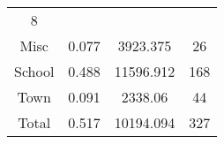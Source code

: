\documentclass[]{book}
\theoremstyle{definition}
\theoremstyle{definition}
\theoremstyle{definition}
\theoremstyle{remark}
\begin{document}
\begin{longtable}[]{@{}cccc@{}}
\begin{minipage}[t]{0.15\columnwidth}
8\strut
\end{minipage}\tabularnewline
\begin{minipage}[t]{0.12\columnwidth}\centering\strut
Misc\strut
\end{minipage} & \begin{minipage}[t]{0.11\columnwidth}\centering\strut
0.077\strut
\end{minipage} & \begin{minipage}[t]{0.15\columnwidth}\centering\strut
3923.375\strut
\end{minipage} & \begin{minipage}[t]{0.15\columnwidth}\centering\strut
26\strut
\end{minipage}\tabularnewline
\begin{minipage}[t]{0.12\columnwidth}\centering\strut
School\strut
\end{minipage} & \begin{minipage}[t]{0.11\columnwidth}\centering\strut
0.488\strut
\end{minipage} & \begin{minipage}[t]{0.15\columnwidth}\centering\strut
11596.912\strut
\end{minipage} & \begin{minipage}[t]{0.15\columnwidth}\centering\strut
168\strut
\end{minipage}\tabularnewline
\begin{minipage}[t]{0.12\columnwidth}\centering\strut
Town\strut
\end{minipage} & \begin{minipage}[t]{0.11\columnwidth}\centering\strut
0.091\strut
\end{minipage} & \begin{minipage}[t]{0.15\columnwidth}\centering\strut
2338.06\strut
\end{minipage} & \begin{minipage}[t]{0.15\columnwidth}\centering\strut
44\strut
\end{minipage}\tabularnewline
\begin{minipage}[t]{0.12\columnwidth}\centering\strut
Total\strut
\end{minipage} & \begin{minipage}[t]{0.11\columnwidth}\centering\strut
0.517\strut
\end{minipage} & \begin{minipage}[t]{0.15\columnwidth}\centering\strut
10194.094\strut
\end{minipage} & \begin{minipage}[t]{0.15\columnwidth}\centering\strut
327\strut
\end{minipage}\tabularnewline
\bottomrule
\end{longtable}
\end{document}

